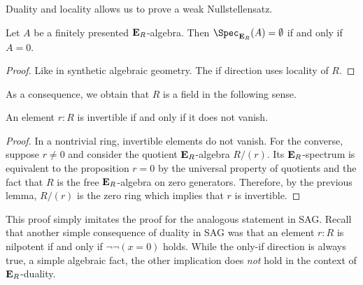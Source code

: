 {Duality and locality allows us to prove a weak Nullstellensatz.

\begin{lemma}
  Let \(A\) be a finitely presented \(\mathbf{E}_R\)-algebra.
  Then \(\Spec_{\EE_R}(A)=\emptyset\) if and only if \(A=0\).
\end{lemma}
\begin{proof}
  Like in synthetic algebraic geometry.
  The if direction uses locality of \(R\).
\end{proof}

As a consequence, we obtain that \(R\) is a field in the following sense.

\begin{lemma}
  An element \(r:R\) is invertible if and only if it does not vanish.
\end{lemma}
\begin{proof}
  In a nontrivial ring, invertible elements do not vanish.
  For the converse, suppose \(r\neq 0\) and consider the quotient \(\mathbf{E}_R\)-algebra \(R/(r)\).
  Its \(\mathbf{E}_R\)-spectrum is equivalent to the proposition \(r=0\) by the universal property of quotients and the fact that \(R\) is the free \(\mathbf{E}_R\)-algebra on zero generators.
  Therefore, by the previous lemma, \(R/(r)\) is the zero ring which implies that \(r\) is invertible.
\end{proof}

This proof simply imitates the proof for the analogous statement in SAG.
Recall that another simple consequence of duality in SAG was that an element \(r:R\) is nilpotent if and only if \(\neg\neg(x=0)\) holds.
While the only-if direction is always true, a simple algebraic fact, the other implication does \emph{not} hold  in the context of \(\mathbf{E}_R\)-duality.


}
